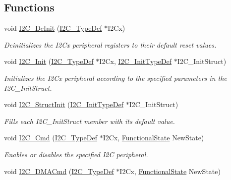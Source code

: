 \subsection*{Functions}
\begin{DoxyCompactItemize}
\item 
void \hyperlink{group___i2_c___private___functions_ga2ee214364603059ad5d9089f749f5bfd}{I2\+C\+\_\+\+De\+Init} (\hyperlink{struct_i2_c___type_def}{I2\+C\+\_\+\+Type\+Def} $\ast$I2\+Cx)
\begin{DoxyCompactList}\small\item\em Deinitializes the I2\+Cx peripheral registers to their default reset values. \end{DoxyCompactList}\item 
void \hyperlink{group___i2_c___private___functions_gaac29465bca70fbc91c2f922ab67bb88e}{I2\+C\+\_\+\+Init} (\hyperlink{struct_i2_c___type_def}{I2\+C\+\_\+\+Type\+Def} $\ast$I2\+Cx, \hyperlink{struct_i2_c___init_type_def}{I2\+C\+\_\+\+Init\+Type\+Def} $\ast$I2\+C\+\_\+\+Init\+Struct)
\begin{DoxyCompactList}\small\item\em Initializes the I2\+Cx peripheral according to the specified parameters in the I2\+C\+\_\+\+Init\+Struct. \end{DoxyCompactList}\item 
void \hyperlink{group___i2_c___private___functions_ga08582aca6d7d7910cd5cbff0d9def350}{I2\+C\+\_\+\+Struct\+Init} (\hyperlink{struct_i2_c___init_type_def}{I2\+C\+\_\+\+Init\+Type\+Def} $\ast$I2\+C\+\_\+\+Init\+Struct)
\begin{DoxyCompactList}\small\item\em Fills each I2\+C\+\_\+\+Init\+Struct member with its default value. \end{DoxyCompactList}\item 
void \hyperlink{group___i2_c___private___functions_ga7e1323c9133c2cb424dfb5b10b7d2f0b}{I2\+C\+\_\+\+Cmd} (\hyperlink{struct_i2_c___type_def}{I2\+C\+\_\+\+Type\+Def} $\ast$I2\+Cx, \hyperlink{group___exported__types_gac9a7e9a35d2513ec15c3b537aaa4fba1}{Functional\+State} New\+State)
\begin{DoxyCompactList}\small\item\em Enables or disables the specified I2C peripheral. \end{DoxyCompactList}\item 
void \hyperlink{group___i2_c___private___functions_ga38502ce11e5ec923e0f6476aaa35b45c}{I2\+C\+\_\+\+D\+M\+A\+Cmd} (\hyperlink{struct_i2_c___type_def}{I2\+C\+\_\+\+Type\+Def} $\ast$I2\+Cx, \hyperlink{group___exported__types_gac9a7e9a35d2513ec15c3b537aaa4fba1}{Functional\+State} New\+State)

\end{DoxyCompactItemize}
